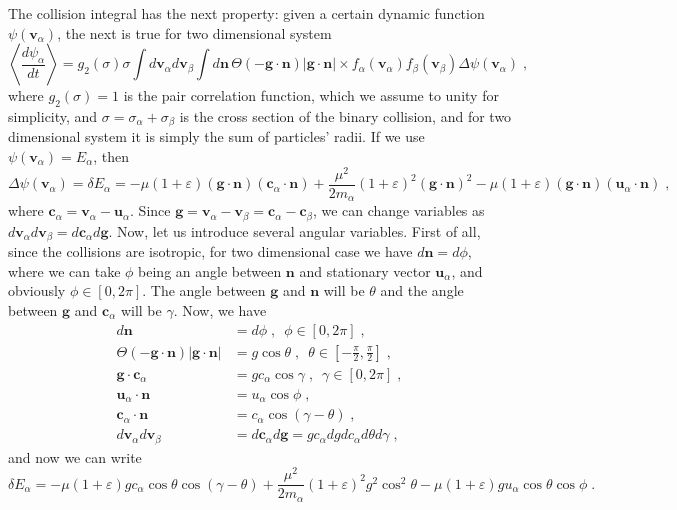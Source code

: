\documentclass[preprint, aps, pra]{revtex4-1}
\newcommand{\eps}{\varepsilon}
\newcommand{\bv}{{\bm{v}}}
\newcommand{\bu}{{\bm{u}}}
\newcommand{\bc}{{\bm{c}}}
\newcommand{\bg}{{\bm{g}}}
\newcommand{\bn}{{\bm{n}}}
\begin{document}
The collision integral has the next property: given a certain dynamic function $\psi(\bv_\alpha)$, the next is true for two dimensional system
\begin{equation}  
  \left\langle\frac{d\psi_\alpha}{dt}\right\rangle=g_2(\sigma)\sigma\int d\bv_\alpha d\bv_\beta\int d\bn\,\Theta(-\bg\cdot\bn)\vert\bg\cdot\bn\vert
  \times f_\alpha(\bv_\alpha)f_\beta(\bv_\beta)\Delta\psi(\bv_\alpha)\;,
\end{equation}
where $g_2(\sigma)=1$ is the pair correlation function, which we assume to unity for simplicity, and $\sigma=\sigma_\alpha+\sigma_\beta$ is 
the cross section of the binary collision, and for two dimensional system it is simply the sum of particles' radii. If we use 
$\psi(\bv_\alpha)=E_\alpha$, then
\begin{equation}
  \Delta\psi(\bv_\alpha)=\delta E_\alpha=-\mu(1+\eps)(\bg\cdot\bn)(\bc_\alpha\cdot\bn)+\frac{\mu^2}{2m_\alpha}(1+\eps)^2(\bg\cdot\bn)^2
  -\mu(1+\eps)(\bg\cdot\bn)(\bu_\alpha\cdot\bn)\;,
\end{equation}
where $\bc_\alpha=\bv_\alpha-\bu_\alpha$. Since $\bg=\bv_\alpha-\bv_\beta=\bc_\alpha-\bc_\beta$, we can change variables as 
$d\bv_\alpha d\bv_\beta=d\bc_\alpha d\bg$. Now, let us introduce several angular variables. First of all, since the collisions are 
isotropic, for two dimensional case we have $d\bn=d\phi$, where we can take $\phi$ being an angle between $\bn$ and stationary vector 
$\bu_\alpha$, and obviously $\phi\in[0, 2\pi]$. The angle between $\bg$ and $\bn$ will be $\theta$ and the angle between $\bg$ and $\bc_\alpha$
will be $\gamma$. Now, we have
\begin{equation}
  \begin{split}
    d\bn &= d\phi\;,\,\,\,\phi\in[0, 2\pi]\;,\\
    \Theta(-\bg\cdot\bn)\vert\bg\cdot\bn\vert &= g\cos\theta\;,\,\,\,\theta\in\left[-\frac{\pi}{2},\frac{\pi}{2}\right]\;,\\
    \bg\cdot\bc_\alpha&= gc_\alpha\cos\gamma\;,\,\,\,\gamma\in[0, 2\pi]\;,\\
    \bu_\alpha\cdot\bn &= u_\alpha\cos\phi\;,\\
    \bc_\alpha\cdot\bn &= c_\alpha\cos(\gamma-\theta)\;,\\
    d\bv_\alpha d\bv_\beta&=d\bc_\alpha d\bg = gc_\alpha dg dc_\alpha d\theta d\gamma\;,
  \end{split}
\end{equation}
and now we can write
\begin{equation}\label{eq:delta_E}
  \delta E_\alpha=-\mu(1+\eps)gc_\alpha\cos\theta\cos(\gamma-\theta)+\frac{\mu^2}{2m_\alpha}(1+\eps)^2g^2\cos^2\theta
  -\mu(1+\eps)gu_\alpha\cos\theta\cos\phi\;.
\end{equation}
\end{document}

